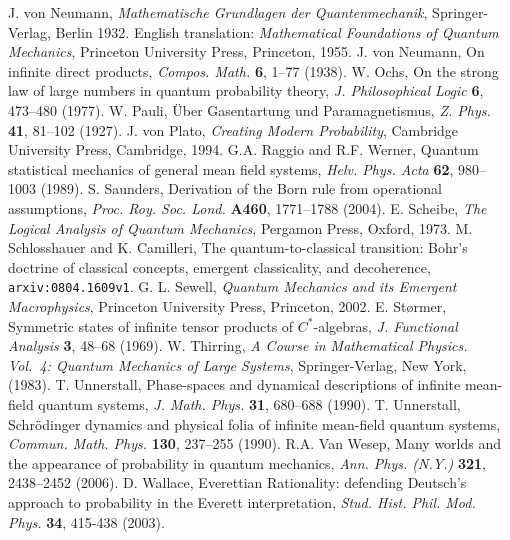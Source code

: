 \documentclass[12pt]{article}
\newcommand{\ca}{$C^*$-algebra} \newcommand{\jba}{JB-algebra}
\begin{document}
\begin{small}
\begin{thebibliography}{99}
 J. von Neumann,  {\it Mathematische Grundlagen der Quantenmechanik},
Springer-Verlag, Berlin 1932. English translation: {\it Mathematical Foundations of Quantum Mechanics}, Princeton University Press, Princeton, 1955.
 J. von Neumann, On infinite direct products, {\it Compos. Math.} {\bf 6}, 1--77
 (1938). 
 W. Ochs, On the strong law of large numbers in quantum probability theory,
{\it J. Philosophical Logic} {\bf 6}, 473--480 (1977). 
 W. Pauli,  \"{U}ber Gasentartung und Paramagnetismus, {\it Z. Phys.} {\bf 41}, 81--102 (1927). 
 J. von Plato, {\it Creating Modern Probability}, Cambridge University Press, Cambridge, 1994. 
   G.A. Raggio and  R.F. Werner,  Quantum statistical mechanics
  of general mean field systems, {\it Helv.  Phys.  Acta} {\bf 62}, 980--1003 (1989).
 S. Saunders, Derivation of the Born rule from operational assumptions, {\it
Proc. Roy. Soc. Lond.}  {\bf A460}, 1771--1788 (2004).
 E. Scheibe,  {\it The Logical Analysis of Quantum Mechanics}, Pergamon Press, Oxford, 1973.
 M. Schlosshauer and K. Camilleri,  The quantum-to-classical transition: Bohr's doctrine of classical concepts, emergent classicality, and decoherence, 
\texttt{arxiv:0804.1609v1}.
  G. L. Sewell,  {\it Quantum Mechanics and its Emergent Macrophysics}, Princeton University Press, Princeton, 2002.
  E. St\o rmer, Symmetric states of infinite tensor products of \ca s, {\it J. Functional Analysis} {\bf 3}, 48--68  (1969). 
 W. Thirring, {\it A Course in Mathematical Physics. Vol.\ 4:
Quantum Mechanics of Large Systems},  Springer-Verlag, New York,  (1983).  
  T.  Unnerstall,  Phase-spaces and dynamical descriptions of infinite mean-field quantum systems, {\it J. Math. Phys.} {\bf 31}, 680--688 (1990).
 T. Unnerstall,  Schr\"{o}dinger dynamics and physical folia of infinite mean-field quantum systems,   {\it Commun.  Math. Phys.} {\bf 130}, 237--255 (1990). 
 R.A. Van Wesep, Many worlds and the appearance of probability in quantum mechanics, {\it  Ann. Phys. (N.Y.)} {\bf 321}, 2438--2452 (2006). 
 D. Wallace,  Everettian Rationality: defending Deutsch's approach to probability in the Everett interpretation, {\it
Stud. Hist. Phil. Mod. Phys.} {\bf 34}, 415-438  (2003). 
\end{thebibliography}\end{small}
\end{document}
